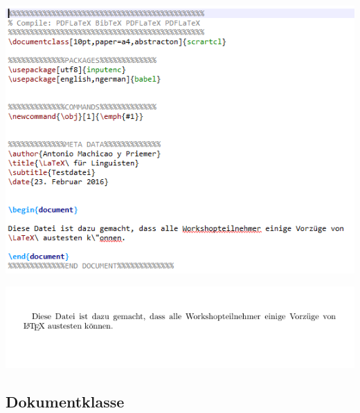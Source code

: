 \begin{frame}[fragile]

\centering
\includegraphics[width=0.9\linewidth]{../../texfiles-beamer/tex-material/WissArb-latex/latexTest2tex}


\end{frame}


\begin{frame}[fragile]

\centering
\includegraphics[width=0.99\linewidth]{../../texfiles-beamer/tex-material/WissArb-latex/latexTest2pdf}

\end{frame}


\subsection{Dokumentklasse}

